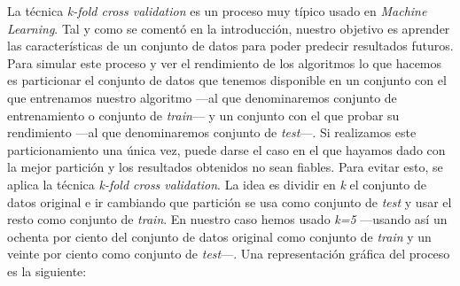 La técnica \textit{k-fold cross validation} es un proceso muy típico usado en \textit{Machine Learning}. Tal y como se comentó en la introducción, nuestro objetivo es aprender las características de un conjunto de datos para poder predecir resultados futuros. Para simular este proceso y ver el rendimiento de los algoritmos lo que hacemos es particionar el conjunto de datos que tenemos disponible en un conjunto con el que entrenamos nuestro algoritmo —al que denominaremos conjunto de entrenamiento o conjunto de \textit{train}— y un conjunto con el que probar su rendimiento —al que denominaremos conjunto de \textit{test}—. Si realizamos este particionamiento una única vez, puede darse el caso en el que hayamos dado con la mejor partición y los resultados obtenidos no sean fiables. Para evitar esto, se aplica la técnica \textit{k-fold cross validation}. La idea es dividir en \textit{k} el conjunto de datos original e ir cambiando que partición se usa como conjunto de \textit{test} y usar el resto como conjunto de \textit{train}. En nuestro caso hemos usado \textit{k=5} —usando así un ochenta por ciento del conjunto de datos original como conjunto de \textit{train} y un veinte por ciento como conjunto de \textit{test}—. Una representación gráfica del proceso es la siguiente:

\newpage

